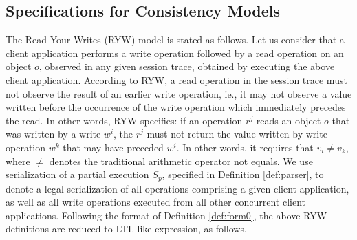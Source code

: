 \documentclass{sig-alternate-05-2015}
\begin{document}
  \subsection{Specifications for Consistency Models}
  The Read Your Writes (RYW) model is stated as follows. Let us consider that a client application performs
    a write operation followed by a read operation on an object $o$, observed in any given session trace, obtained by executing the above client application.
    According to RYW, a read operation in the session trace must not observe the result of an earlier write
    operation, ie., it may not observe a value written before the occurrence of the write operation which
    immediately precedes the read. In other words, RYW specifies: if an operation $r^j$ reads an object $o$
    that was written by a  write $w^i$,  the $r^j$ must not return the value written by write operation $w^k$ that
    may have preceded $w^i$.
     In other words, it requires that $v_i \not= v_k$, where $\not=$ denotes the traditional arithmetic operator not equals.
  We use serialization of a partial execution $S_p$, specified in Definition \ref{def:parser}, to denote a legal serialization of all operations comprising a given client
  application, as well as all write
  operations  executed from all other concurrent client applications. Following the format of Definition \ref{def:form0}, the above RYW definitions are reduced to LTL-like expression, as follows.
\end{document}
